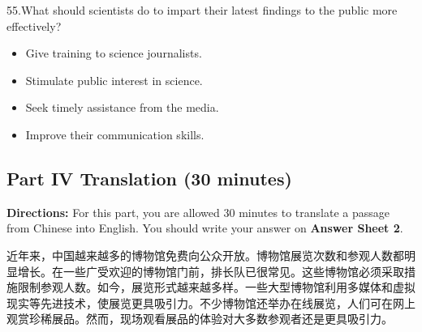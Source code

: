 \documentclass[UTF8,11pt]{ctexart}
\begin{document}
55.What should scientists do to impart their latest findings to the public more effectively?


\begin{itemize}[leftmargin=2em,itemsep=.2em,topsep=.4em]\item[A.] Give training to science journalists.
\item[B.] Stimulate public interest in science.
\item[C.] Seek timely assistance from the media.
\item[D.] Improve their communication skills.
\end{itemize}

\subsection*{\textbf{Part IV} \textbf{Translation} \textbf{(30 minutes)}}


\textbf{Directions:} For this part, you are allowed 30 minutes to translate a passage from Chinese into English. You should write your answer on\textbf{ Answer Sheet 2}.


近年来，中国越来越多的博物馆免费向公众开放。博物馆展览次数和参观人数都明显增长。在一些广受欢迎的博物馆门前，排长队已很常见。这些博物馆必须采取措施限制参观人数。如今，展览形式越来越多样。一些大型博物馆利用多媒体和虚拟现实等先进技术，使展览更具吸引力。不少博物馆还举办在线展览，人们可在网上观赏珍稀展品。然而，现场观看展品的体验对大多数参观者还是更具吸引力。
\end{document}
